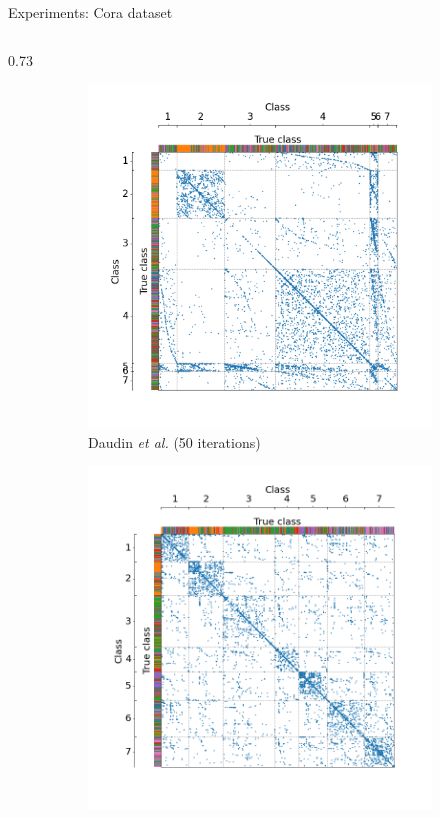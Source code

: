 \documentclass[final]{beamer}
\newlength{\colwidth}
\begin{document}
\begin{frame}[t]
\begin{columns}[t]
\begin{column}{\colwidth}
\begin{block}{Experiments: Cora dataset}
\begin{column}{0.73\colwidth}
\begin{figure}[H]
\begin{subfigure}{0.45\linewidth}
              \includegraphics[width=\linewidth, trim={45 25 35 40}, clip]{figures/cora_sbm.png}
              \caption{Daudin \textit{et al.} (50 iterations)}
              \label{fig:cora_SBM}
            \end{subfigure}
            \hfill
            \medskip
            \hfill
            \begin{subfigure}{0.45\linewidth}
              \centering
              \includegraphics[width=\linewidth, trim={45 25 35 40}, clip]{figures/cora_Newman.png}

\end{subfigure}
\end{figure}
\end{column}
\end{block}
\end{column}
\end{columns}
\end{frame}
\end{document}
